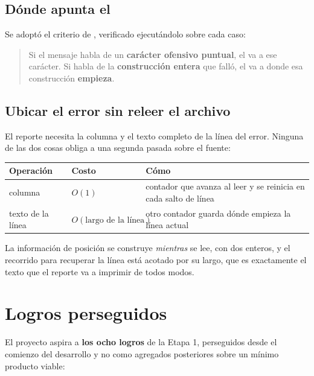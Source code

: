 \documentclass[11pt,a4paper]{article}
\begin{document}
\subsection{Dónde apunta el \lex{\caret}}

Se adoptó el criterio de , verificado ejecutándolo sobre cada caso:

\begin{quote}
Si el mensaje habla de un \textbf{carácter ofensivo puntual}, el \lex{\caret} va a ese carácter. Si habla
de la \textbf{construcción entera} que falló, el \lex{\caret} va a donde esa construcción \textbf{empieza}.
\end{quote}

\subsection{Ubicar el error sin releer el archivo}

El reporte necesita la columna y el texto completo de la línea del error. Ninguna de las dos cosas
obliga a una segunda pasada sobre el fuente:

\begin{center}
\begin{tabular}{@{}lll@{}}
\toprule
\textbf{Operación} & \textbf{Costo} & \textbf{Cómo} \\
\midrule
columna & $O(1)$ & contador que avanza al leer y se reinicia en cada salto de línea \\
texto de la línea & $O(\text{largo de la línea})$ & otro contador guarda dónde empieza la línea actual \\
\bottomrule
\end{tabular}
\end{center}

\medskip
La información de posición se construye \emph{mientras} se lee, con dos enteros, y el recorrido para
recuperar la línea está acotado por su largo, que es exactamente el texto que el reporte va a
imprimir de todos modos.

\section{Logros perseguidos}

El proyecto aspira a \textbf{los ocho logros} de la Etapa 1, perseguidos desde el comienzo del
desarrollo y no como agregados posteriores sobre un mínimo producto viable:
\end{document}
